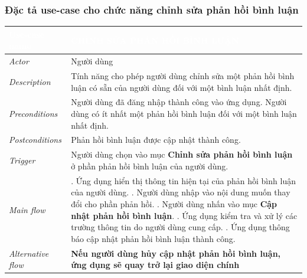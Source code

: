 \subsubsection{Đặc tả use-case cho chức năng chỉnh sửa phản hồi bình luận}
\begin{center}
    \arrayrulewidth=2pt
    \begin{longtable}{
        |>{\raggedright\arraybackslash}p{3cm}
        |>{\raggedright\arraybackslash}p{13cm}
        |}
        \hline
        \rowcolor{cyan!75!black} \textcolor{white}{\textbf{Use-case name}} & \textcolor{white}{\textbf{CHỈNH SỬA PHẢN HỒI BÌNH LUẬN}}
        \\\hline
        \rowcolor{cyan!10!white} \textit{Actor} & Người dùng
        \\\hdashline
        \rowcolor{cyan!10!white} \textit{Description} & Tính năng cho phép người dùng chỉnh sửa một phản hồi bình luận có sẵn của người dùng đối với một bình luận nhất định.
        \\\hdashline
        \rowcolor{cyan!10!white} \textit{Preconditions} & Người dùng đã đăng nhập thành công vào ứng dụng. Người dùng có ít nhất một phản hồi bình luận đối với một bình luận nhất định.
        \\\hdashline
        \rowcolor{cyan!10!white} \textit{Postconditions} & Phản hồi bình luận được cập nhật thành công.
        \\\hdashline
        \rowcolor{cyan!10!white} \textit{Trigger} & Người dùng chọn vào mục \textbf{Chỉnh sửa phản hồi bình luận} ở phần phản hồi bình luận của người dùng.
        \\\hdashline
        \rowcolor{cyan!10!white} \textit{Main flow} &
        1. Ứng dụng hiển thị thông tin hiện tại của phản hồi bình luận của người dùng. \newline
        2. Người dùng nhập vào nội dung muốn thay đổi cho phần phản hồi. \newline
        3. Người dùng nhấn vào mục \textbf{Cập nhật phản hồi bình luận}. \newline
        4. Ứng dụng kiểm tra và xử lý các trường thông tin do người dùng cung cấp. \newline
        5. Ứng dụng thông báo cập nhật phản hồi bình luận thành công.
        \\\hdashline
        \rowcolor{cyan!10!white} \textit{Alternative flow} & 
        \textbf{Nếu người dùng hủy cập nhật phản hồi bình luận, ứng dụng sẽ quay trở lại giao diện chính} \newline

\end{longtable}
\end{center}
